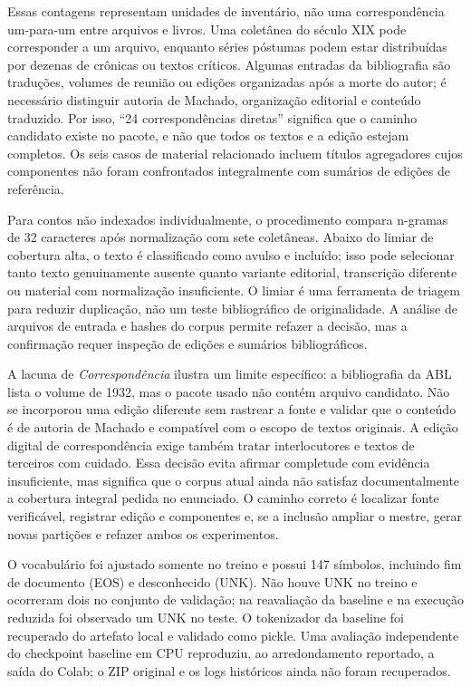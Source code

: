 \documentclass[conference]{IEEEtran}
\begin{document}
Essas contagens representam unidades de inventário, não uma correspondência um-para-um entre arquivos e livros. Uma coletânea do século XIX pode corresponder a um arquivo, enquanto séries póstumas podem estar distribuídas por dezenas de crônicas ou textos críticos. Algumas entradas da bibliografia são traduções, volumes de reunião ou edições organizadas após a morte do autor; é necessário distinguir autoria de Machado, organização editorial e conteúdo traduzido. Por isso, “24 correspondências diretas” significa que o caminho candidato existe no pacote, e não que todos os textos e a edição estejam completos. Os seis casos de material relacionado incluem títulos agregadores cujos componentes não foram confrontados integralmente com sumários de edições de referência.

Para contos não indexados individualmente, o procedimento compara n-gramas de 32 caracteres após normalização com sete coletâneas. Abaixo do limiar de cobertura alta, o texto é classificado como avulso e incluído; isso pode selecionar tanto texto genuinamente ausente quanto variante editorial, transcrição diferente ou material com normalização insuficiente. O limiar é uma ferramenta de triagem para reduzir duplicação, não um teste bibliográfico de originalidade. A análise de arquivos de entrada e hashes do corpus permite refazer a decisão, mas a confirmação requer inspeção de edições e sumários bibliográficos.

A lacuna de \textit{Correspondência} ilustra um limite específico: a bibliografia da ABL lista o volume de 1932, mas o pacote usado não contém arquivo candidato. Não se incorporou uma edição diferente sem rastrear a fonte e validar que o conteúdo é de autoria de Machado e compatível com o escopo de textos originais. A edição digital de correspondência exige também tratar interlocutores e textos de terceiros com cuidado. Essa decisão evita afirmar completude com evidência insuficiente, mas significa que o corpus atual ainda não satisfaz documentalmente a cobertura integral pedida no enunciado. O caminho correto é localizar fonte verificável, registrar edição e componentes e, se a inclusão ampliar o mestre, gerar novas partições e refazer ambos os experimentos.

O vocabulário foi ajustado somente no treino e possui 147 símbolos, incluindo fim de documento (EOS) e desconhecido (UNK). Não houve UNK no treino e ocorreram dois no conjunto de validação; na reavaliação da baseline e na execução reduzida foi observado um UNK no teste. O tokenizador da baseline foi recuperado do artefato local e validado como pickle. Uma avaliação independente do checkpoint baseline em CPU reproduziu, ao arredondamento reportado, a saída do Colab; o ZIP original e os logs históricos ainda não foram recuperados.
\end{document}
